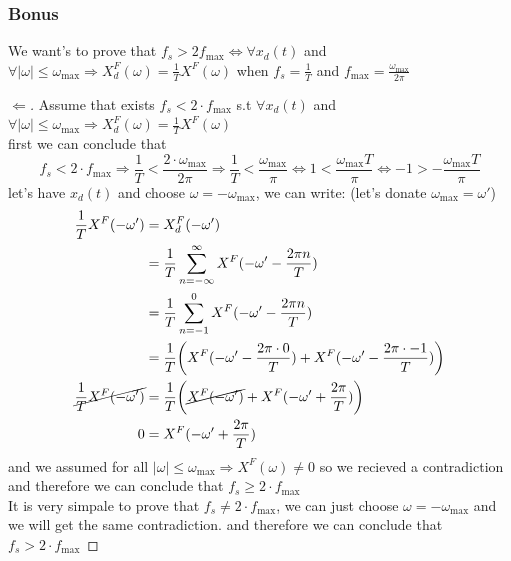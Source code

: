 \documentclass{article}
\begin{document}
\subsubsection{Bonus}
    We want's to prove that $f_s > 2f_{\max} \iff \forall x_d(t)$ and $\forall |\omega| \leq \omega_{\max} \Rightarrow X_d^F(\omega) = \frac{1}{T}X^F(\omega)$
    when $f_s= \frac1T$ and $f_{\max} = \frac{\omega_{\max}}{2\pi}$
    $ $\newline
    \begin{proof}[$\Leftarrow$]
        Assume that exists $f_s < 2\cdot f_{\max}$ s.t $\forall x_d(t)$ and $\forall |\omega| \leq \omega_{\max} \Rightarrow X_d^F(\omega) = \frac{1}{T}X^F(\omega)$ \\
        first we can conclude that 
        \begin{equation}
            f_s < 2\cdot f_{\max} \Rightarrow \frac{1}{T} < \frac{2\cdot \omega_{\max}}{2\pi} \Rightarrow \frac{1}{T} < \frac{\omega_{\max}}{\pi} \iff 1 < \frac{\omega_{\max}T}{\pi} \iff -1 > -\frac{\omega_{\max}T}{\pi}
            \end{equation}
        let's have $x_d(t)$ and choose $\omega=-\omega_{\max}$, we can write: (let's donate $\omega_{\max}=\omega'$)
        \begin{equation}
            \begin{aligned}
                 \frac{1}{T}X^F(-\omega') &= X_d^F(-\omega')\\
                 &= \frac{1}{T}\sum^\infty_{n=-\infty}X^F(-\omega' - \frac{2\pi n}{T})\\
                    &= \frac{1}{T}\sum^0_{n=-1}X^F(-\omega' - \frac{2\pi n}{T})\\
                    &= \frac{1}{T}\bigg(X^F(-\omega' - \frac{2\pi \cdot 0}{T}) + X^F(-\omega' - \frac{2\pi \cdot -1}{T})\bigg)\\
                    \cancel{\frac{1}{T}X^F(-\omega')} &= \frac{1}{T}\bigg(\cancel{X^F(-\omega')} + X^F(-\omega' + \frac{2\pi}{T})\bigg)\\
                    0 &= X^F(-\omega' + \frac{2\pi}{T})
            \end{aligned}
        \end{equation}
        and we assumed for all $|\omega| \leq \omega_{\max} \Rightarrow X^F(\omega)\ne 0$
        so we recieved a contradiction and therefore we can conclude that $f_s \geq 2\cdot f_{\max}$\\
        $ $\newline It is very simpale to prove that $f_s \ne 2 \cdot f_{\max}$, we can just choose $\omega = -\omega_{\max}$ and we will get the same contradiction.
        and therefore we can conclude that $f_s > 2\cdot f_{\max}$
    \end{proof}
\end{document}
